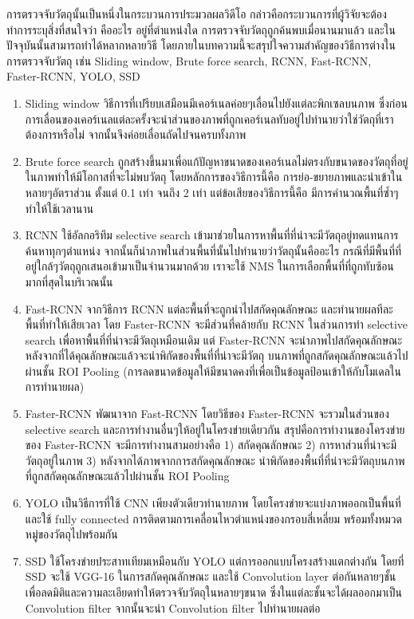 การตรวจจับวัตถุนั้นเป็นหนึ่งในกระบวนการประมวลผลวิดีโอ\textsuperscript{\cite{object_detection}} กล่าวคือกระบวนการที่ผู้วิจัยจะต้องทำการระบุสิ่งที่สนใจว่า คืออะไร อยู่ที่ตำแหน่งใด การตรวจจับวัตถุถูกค้นพบเมื่อนานมาแล้ว 
และในปัจจุบันนั้นสามารถทำได้หลากหลายวิธี โดยภายในบทความนี้จะสรุปใจความสำคัญของวิธีการต่างในการตรวจจับวัตถุ เช่น Sliding window, Brute force search, RCNN, 
Fast-RCNN, Faster-RCNN, YOLO, SSD 
\begin{enumerate}
	\item Sliding window วิธีการที่เปรียบเสมือนมีเคอร์เนลค่อยๆเลื่อนไปยังแต่ละพิกเซลบนภาพ ซึ่งก่อนการเลื่อนของเคอร์เนลแต่ละครั้งจะนำส่วนของภาพที่ถูกเคอร์เนลทับอยู่ไปทำนายว่าใช่วัตถุที่เราต้องการหรือไม่ 
	จากนั้นจึงค่อยเลื่อนถัดไปจนครบทั้งภาพ
	\item Brute force search ถูกสร้างขึ้นมาเพื่อแก้ปัญหาขนาดของเคอร์เนลไม่ตรงกับขนาดของวัตถุที่อยู่ในภาพทำให้มีโอกาสที่จะไม่พบวัตถุ โดยหลักการของวิธีการนี้คือ 
	การย่อ-ขยายภาพและนำเข้าในหลายๆอัตราส่วน ตั้งแต่ 0.1 เท่า จนถึง 2 เท่า แต่ข้อเสียของวิธีการนี้คือ มีการคำนวณพื้นที่ซ้ำๆทำให้ใช้เวลานาน
	\item RCNN ใช้อัลกอริทึม selective search เข้ามาช่วยในการหาพื้นที่ที่น่าจะมีวัตถุอยู่ทดแทนการค้นหาทุกๆตำแหน่ง จากนั้นก็นำภาพในส่วนพื้นที่นั้นไปทำนายว่าวัตถุนั้นคืออะไร 
	กรณีที่มีพื้นที่ที่อยู่ใกล้ๆวัตถุถูกเสนอเข้ามาเป็นจำนวนมากด้วย เราจะใช้ NMS ในการเลือกพื้นที่ที่ถูกทับซ้อนมากที่สุดในบริเวณนั้น
	\item Fast-RCNN จากวิธีการ RCNN แต่ละพื้นที่จะถูกนำไปสกัดคุณลักษณะ และทำนายผลทีละพื้นที่ทำให้เสียเวลา โดย Faster-RCNN จะมีส่วนที่คล้ายกับ RCNN ในส่วนการทำ 
	selective search เพื่อหาพื้นที่ที่น่าจะมีวัตถุเหมือนเดิม แต่ Faster-RCNN จะนำภาพไปสกัดคุณลักษณะ หลังจากที่ได้คุณลักษณะแล้วจะนำพิกัดของพื้นที่ที่น่าจะมีวัตถุ 
	บนภาพที่ถูกสกัดคุณลักษณะแล้วไปผ่านชั้น ROI Pooling (การลดขนาดข้อมูลให้มีขนาดคงที่เพื่อเป็นข้อมูลป้อนเข้าให้กับโมเดลในการทำนายผล)
	\item Faster-RCNN พัฒนาจาก Fast-RCNN โดยวิธีของ Faster-RCNN จะรวมในส่วนของ selective search และการทำงานอื่นๆให้อยู่ในโครงข่ายเดียวกัน 
	สรุปคือการทำงานของโครงข่ายของ Faster-RCNN จะมีการทำงานสามอย่างคือ 1) สกัดคุณลักษณะ 2) การหาส่วนที่น่าจะมีวัตถุอยู่ในภาพ 3) หลังจากได้ภาพจากการสกัดคุณลักษณะ 
	นำพิกัดของพื้นที่ที่น่าจะมีวัตถุบนภาพที่ถูกสกัดคุณลักษณะแล้วไปผ่านชั้น ROI Pooling
	\item YOLO เป็นวิธีการที่ใช้ CNN เพียงตัวเดียวทำนายภาพ โดยโครงข่ายจะแบ่งภาพออกเป็นพื้นที่ และใช้ fully connected การติดตามการเคลื่อนไหวตำแหน่งของกรอบสี่เหลี่ยม 
	พร้อมทั้งหมวดหมู่ของวัตถุไปพร้อมกัน 
	\item SSD ใช้โครงข่ายประสาทเทียมเหมือนกับ YOLO แต่การออกแบบโครงสร้างแตกต่างกัน โดยที่ SSD จะใช้ VGG-16 ในการสกัดคุณลักษณะ และใช้ Convolution layer 
	ต่อกันหลายๆชั้นเพื่อลดมิติและความละเอียดทำให้ตรวจจับวัตถุในหลายๆขนาด ซึ่งในแต่ละชั้นจะได้ผลออกมาเป็น Convolution filter จากนั้นจะนำ Convolution filter ไปทำนายผลต่อ
\end{enumerate}